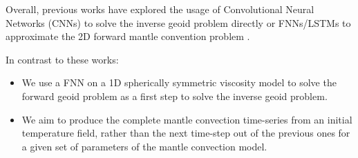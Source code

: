 Overall, previous works have explored the usage of Convolutional Neural Networks (CNNs) to solve the inverse geoid problem directly \citep{kerl2022geoid} or FNNs/LSTMs to approximate the 2D forward mantle convention problem \citep{10.1103_physrevfluids.6.113801}. 

In contrast to these works:
\begin{itemize}
    \item We use a FNN on a 1D spherically symmetric viscosity model to solve the forward geoid problem as a first step to solve the inverse geoid problem.
    
    \item We aim to produce the complete mantle convection time-series from an initial temperature field, rather than the next time-step out of the previous ones for a given set of parameters of the mantle convection model.
\end{itemize}
